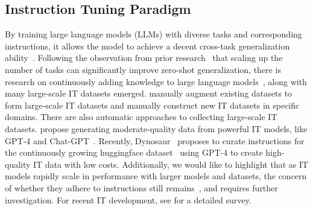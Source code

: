\subsection{Instruction Tuning Paradigm}
By training large language models (LLMs) with diverse tasks and corresponding instructions, it allows the model to achieve a decent cross-task generalization ability~\cite{wei2021finetuned,sanh2021multitask, Wang2022SuperNaturalInstructionsGV, alpaca, vicuna2023, ouyang2022training}.
Following the observation from prior research~\cite {xu2022zeroprompt, wang2022self} that scaling up the number of tasks can significantly improve zero-shot generalization, there is research on continuously adding knowledge to large language models~\cite{scialom-etal-2022-fine, jang2023exploring}, along with many large-scale IT datasets emerged.
\citet{wang2022self, wei2021finetuned, bach2022promptsource, xu2022zeroprompt, Jiao2023ParroTTD} manually augment existing datasets to form large-scale IT datasets and \citet{gupta2022improving, finlayson2022makes} manually construct new IT datasets in specific domains. There are also automatic approaches to collecting large-scale IT datasets. \citet{wang2022self, honovich2022unnatural} propose generating moderate-quality data from powerful IT models, like GPT-4 and Chat-GPT~\cite{openai2023gpt4}.
Recently, Dynosaur~\cite{yin2023dynosaur} proposes to curate instructions for the continuously growing huggingface dataset~\cite{lhoest-etal-2021-datasets} using GPT-4 to create high-quality IT data with low costs.
Additionally, we would like to highlight that as IT models rapidly scale in performance with larger models and datasets, the concern of whether they adhere to instructions still remains~\cite{yin2023did, kung2023models, min2022rethinking, yang2023lacma, li2023evaluating, xue2023tadis}, and requires further investigation. For recent IT development, see \cite{zhang2023instruction} for a detailed survey.


